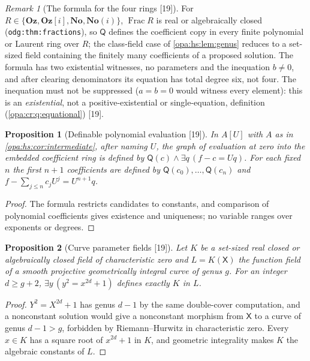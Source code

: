 \documentclass[11pt,oneside]{article}
\numberwithin{equation}{section}
\newtheorem{proposition}[proposition]{Proposition}
\theoremstyle{definition}
\theoremstyle{remark}
\newtheorem{remark}[remark]{Remark}
\newcommand{\No}{\mathbf{No}}
\newcommand{\Oz}{\mathbf{Oz}}
\newcommand{\Og}{\mathbf{Oz}[i]}
\newcommand{\SC}{\mathbf{No}(i)}
\newcommand{\Frac}{\operatorname{Frac}}
\newcommand{\src}[1]{\textup{\textsf{\small[#1]}}}
\newcommand{\lbl}[1]{\nolinkurl{#1}}
\begin{document}
\begin{remark}[The formula for the four rings \src{19}]\label{opa:hs:rem:theta}
For $R\in\{\Oz,\Og,\No,\SC\}$, $\Frac R$ is real or algebraically closed (\lbl{odg:thm:fractions}), so $\mathsf Q$ defines the coefficient copy in every
finite polynomial or Laurent ring over $R$; the class-field case of \cref{opa:hs:lem:genus} reduces to a set-sized field containing the finitely many
coefficients of a proposed solution. The formula has two existential witnesses, no parameters and the inequation $b\ne0$, and after clearing
denominators its equation has total degree six, not four. The inequation must not be suppressed ($a=b=0$ would witness every element): this is an
\emph{existential}, not a positive-existential or single-equation, definition (\cref{opa:cr:q:equational}) \src{19}.
\end{remark}

\begin{proposition}[Definable polynomial evaluation \src{19}]\label{opa:hs:prop:polyeval}
In $A[U]$ with $A$ as in \cref{opa:hs:cor:intermediate}, after naming $U$, the graph of evaluation at zero into the embedded coefficient ring is
defined by $\mathsf Q(c)\wedge\exists q\,(f-c=Uq)$. For each fixed $n$ the first $n+1$ coefficients are defined by $\mathsf Q(c_0),\dots,\mathsf Q(c_n)$ and
$f-\sum_{j\le n}c_jU^j=U^{n+1}q$.
\end{proposition}
\begin{proof}
The formula restricts candidates to constants, and comparison of polynomial coefficients gives existence and uniqueness; no variable ranges over
exponents or degrees.
\end{proof}

\begin{proposition}[Curve parameter fields \src{19}]\label{opa:hs:prop:genusbound}
Let $K$ be a set-sized real closed or algebraically closed field of characteristic zero and $L=K(\mathsf X)$ the function field of a smooth projective
geometrically integral curve of genus $g$. For an integer $d\ge g+2$, $\exists y\,(y^2=x^{2d}+1)$ defines exactly $K$ in $L$.
\end{proposition}
\begin{proof}
$Y^2=X^{2d}+1$ has genus $d-1$ by the same double-cover computation, and a nonconstant solution would give a nonconstant morphism from $\mathsf X$ to a
curve of genus $d-1>g$, forbidden by Riemann--Hurwitz in characteristic zero. Every $x\in K$ has a square root of $x^{2d}+1$ in $K$, and geometric
integrality makes $K$ the algebraic constants of $L$.
\end{proof}
\end{document}

